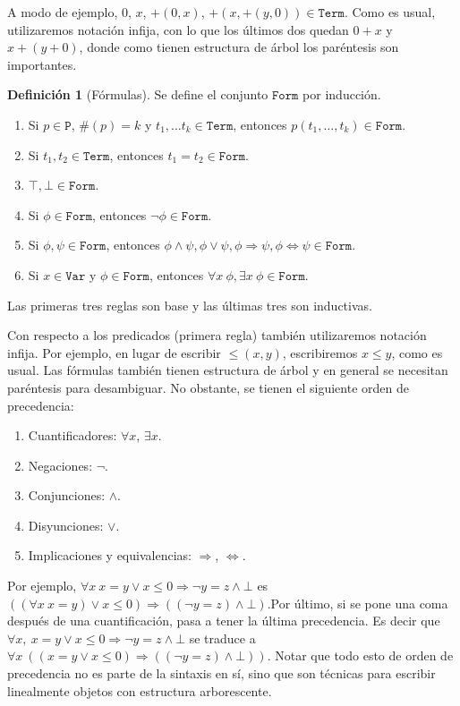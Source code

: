 \documentclass[a4paper, 12pt]{report}
\newcommand{\Ra}{\Rightarrow}
\newcommand{\Lra}{\Leftrightarrow}
\theoremstyle{definition}
\newtheorem{definicion}[teorema]{Definición}
\begin{document}
A modo de ejemplo, $0$, $x$, $+(0,x)$, $+(x,+(y,0))\in\mathtt{Term}$. Como es usual, utilizaremos notación infija, con lo que los últimos dos quedan $0+x$ y $x+(y+0)$, donde como tienen estructura de árbol los paréntesis son importantes.

\begin{definicion}[Fórmulas]
	Se define el conjunto $\mathtt{Form}$ por inducción.
	\begin{enumerate}
		\item Si $p\in\mathtt{P}$, $\#(p)=k$ y $t_1,\dots t_k\in\mathtt{Term}$, entonces $p(t_1,\dots,t_k)\in\mathtt{Form}$.
		\item Si $t_1,t_2\in\mathtt{Term}$, entonces $t_1=t_2\in\mathtt{Form}$.
		\item $\top,\bot\in\mathtt{Form}$.
		\item Si $\phi\in\mathtt{Form}$, entonces $\lnot\phi\in\mathtt{Form}$. 
		\item Si $\phi,\psi\in\mathtt{Form}$, entonces $\phi\wedge\psi,\phi\vee\psi,\phi\Ra\psi,\phi\Lra\psi\in\mathtt{Form}$.
		\item Si $x\in\mathtt{Var}$ y $\phi\in\mathtt{Form}$, entonces $\forall x~\phi,\exists x~\phi\in\mathtt{Form}$.
	\end{enumerate}
	Las primeras tres reglas son base y las últimas tres son inductivas.
\end{definicion}

Con respecto a los predicados (primera regla) también utilizaremos notación infija. Por ejemplo, en lugar de escribir $\leq(x,y)$, escribiremos $x\leq y$, como es usual. Las fórmulas también tienen estructura de árbol y en general se necesitan paréntesis para desambiguar. No obstante, se tienen el siguiente orden de precedencia:
\begin{enumerate}
	\item Cuantificadores: $\forall x$, $\exists x$.
	\item Negaciones: $\lnot$.
	\item Conjunciones: $\wedge$.
	\item Disyunciones: $\vee$.
	\item Implicaciones y equivalencias: $\Ra$, $\Lra$.
\end{enumerate}
Por ejemplo, $\forall x ~x=y\vee x\leq 0\Ra \lnot y=z\wedge \bot$ es $((\forall x ~x=y)\vee x\leq 0)\Ra ((\lnot y=z)\wedge \bot)$.\linebreak Por último, si se pone una coma después de una cuantificación, pasa a tener la última precedencia. Es decir que $\forall x, ~x=y\vee x\leq 0\Ra \lnot y=z\wedge \bot$ se traduce a \linebreak $\forall x ~((x=y\vee x\leq 0)\Ra ((\lnot y=z)\wedge \bot))$. Notar que todo esto de orden de precedencia no es parte de la sintaxis en sí, sino que son técnicas para escribir linealmente objetos con estructura arborescente.
\end{document}

